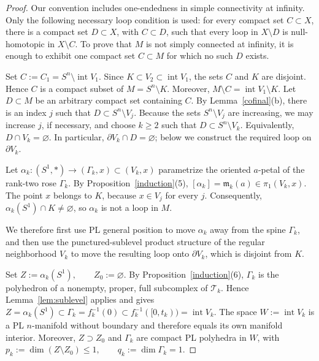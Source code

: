 \documentclass[12pt,oneside,a4paper]{article}
\theoremstyle{mytheorem}
\theoremstyle{remark}
\theoremstyle{definition}
\begin{document}
\begin{proof}
Our convention includes one-endedness in simple connectivity at infinity.
Only the following necessary loop condition is used:
for every compact set \(C\subset X\), there is a compact set
\(D\subset X\), with \(C\subset D\), such that every loop in
\(X\setminus D\) is null-homotopic in \(X\setminus C\).  To prove that
\(M\) is not simply connected at infinity, it is enough to exhibit one
compact set \(C\subset M\) for which no such \(D\) exists.

Set $C:=C_1=S^n\setminus\operatorname{int}V_1$.  Since
$K\subset V_2\subset\operatorname{int}V_1$, the sets $C$ and $K$ are
disjoint.  Hence $C$ is a compact subset of $M=S^n\setminus K$.
Moreover, $M\setminus C=\operatorname{int}V_1\setminus K$.
Let \(D\subset M\) be an arbitrary compact set containing \(C\).
By Lemma~\ref{cofinal}(b), there is an index \(j\) such that
$D\subset S^n\setminus V_j$.
Because the sets $S^n\setminus V_j$ are increasing, we may
increase \(j\), if necessary, and choose \(k\geq2\) such that
$D\subset S^n\setminus V_k$.  Equivalently, $D\cap V_k=\varnothing$.
In particular, $\partial V_k\cap D=\varnothing$; below we construct the
required loop on $\partial V_k$.


Let $\alpha_k:(S^1,*)\to(\Gamma_k,x)\subset(V_k,x)$ parametrize the
oriented $a$-petal of the rank-two rose $\Gamma_k$.  By
Proposition~\ref{induction}(5),
$[\alpha_k]=\mathfrak{m}_k(a)\in\pi_1(V_k,x).$
The point $x$ belongs to $K$, because $x\in V_j$ for every $j$.
Consequently, $\alpha_k(S^1)\cap K\neq\varnothing$, so $\alpha_k$ is not
a loop in $M$.

We therefore first use
PL general position to move \(\alpha_k\) away from the spine
\(\Gamma_k\), and then use the punctured-sublevel product structure of
the regular neighborhood \(V_k\) to move the resulting loop onto
\(\partial V_k\), which is disjoint from \(K\).

Set $Z:=\alpha_k(S^1),\qquad Z_0:=\varnothing.$
By Proposition~\ref{induction}(6), $\Gamma_k$ is the polyhedron of a
nonempty, proper, full subcomplex of $\mathcal{T}_k$.  Hence
Lemma~\ref{lem:sublevel} applies and gives
\(Z=\alpha_k(S^1)\subset\Gamma_k=f_k^{-1}(0)
\subset f_k^{-1}([0,t_k))=\operatorname{int}V_k\).
The space $W:=\operatorname{int}V_k$ is a PL $n$-manifold without
boundary and therefore equals its own manifold interior.  Moreover,
$Z\supset Z_0$ and $\Gamma_k$ are compact PL polyhedra in $W$, with
$p_k:=\dim(Z\setminus Z_0)\leq1,
 \qquad
 q_k:=\dim\Gamma_k=1.$


\end{proof}
\end{document}
